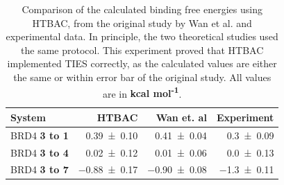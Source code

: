 \begin{table}
  \centering
  \caption{Comparison of the calculated binding free energies using HTBAC,
  from the original study by Wan et al. and experimental data. In
  principle, the two theoretical studies used the same
  protocol. This experiment proved that HTBAC implemented TIES correctly, as
  the calculated values are either the same or within error bar of the
  original study. All values are in \textbf{kcal mol\textsuperscript{-1}}.}  
  \begin{tabular}{lrrr}
    \toprule
    System & HTBAC & Wan et. al & Experiment \\
    \midrule
    BRD4 \textbf{3 to 1} & \num{0.39 +- 0.10} &   \num{0.41 +- 0.04} &  \num{0.3 +- 0.09} \\
    BRD4 \textbf{3 to 4} & \num{0.02 +- 0.12} &   \num{0.01 +- 0.06} &  \num{0.0 +- 0.13} \\
    BRD4 \textbf{3 to 7} & \num{-0.88 +- 0.17} &  \num{-0.90 +- 0.08} & \num{-1.3 +- 0.11} \\
    \bottomrule
  \end{tabular}
  \label{tab:exp2}
\end{table}




